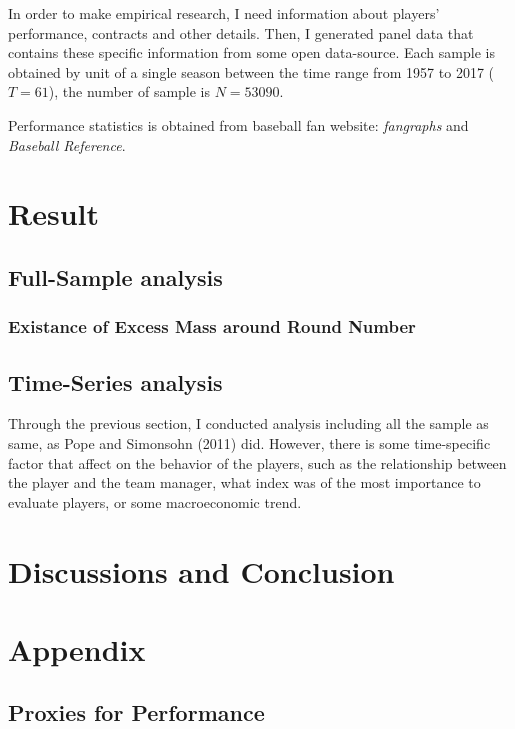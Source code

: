 \documentclass[dvipdfmx]{article}
\begin{document}
 In order to make empirical research, I need information
 about players' performance, contracts and other details.
 Then, I generated panel data that contains these specific information
 from some open data-source. Each sample is obtained by unit of a
 single season between the time range from 1957 to 2017 ($T = 61$),
 the number of sample is $N = 53090$.

 Performance statistics is obtained from baseball fan website:
 \textit{fangraphs} and \textit{Baseball Reference}.





\section{Result}

 \subsection{Full-Sample analysis}
  \subsubsection{Existance of Excess Mass around Round Number}



 \subsection{Time-Series analysis}


Through the previous section, I conducted analysis including
all the sample as same, as Pope and Simonsohn (2011) did.
However, there is some time-specific factor that affect on
the behavior of the players, such as the relationship
between the player and the team manager, what index
was of the most importance to evaluate players, or some
macroeconomic trend.


\section{Discussions and Conclusion}



\section{Appendix}

\subsection{Proxies for Performance}
\end{document}
